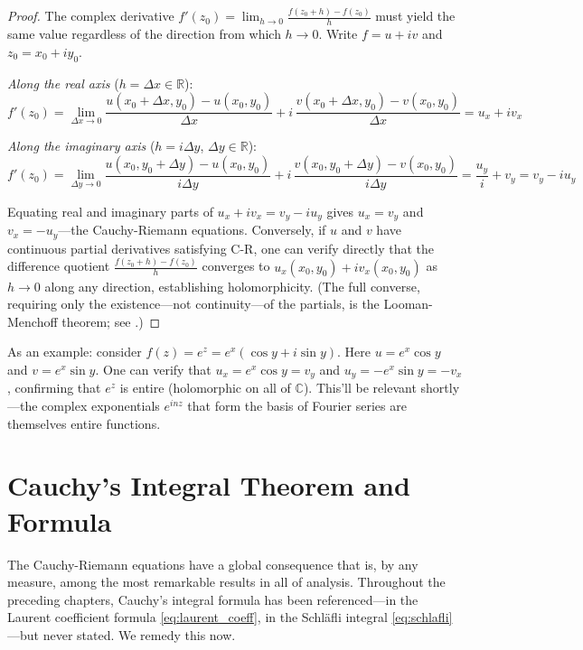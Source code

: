 \documentclass[12pt,a4paper]{report}
\theoremstyle{thms}
\theoremstyle{defns}
\begin{document}
\begin{proof}
    The complex derivative $f'(z_0) = \lim_{h\to 0} \frac{f(z_0+h) - f(z_0)}{h}$ must yield the same value regardless of the direction from which $h \to 0$. Write $f = u + iv$ and $z_0 = x_0 + iy_0$.

    \textit{Along the real axis} ($h = \Delta x \in \mathbb{R}$):
    \begin{equation}
        f'(z_0) = \lim_{\Delta x \to 0} \dfrac{u(x_0 + \Delta x, y_0) - u(x_0, y_0)}{\Delta x} + i\,\dfrac{v(x_0 + \Delta x, y_0) - v(x_0, y_0)}{\Delta x} = u_x + iv_x
    \end{equation}

    \textit{Along the imaginary axis} ($h = i\Delta y$, $\Delta y \in \mathbb{R}$):
    \begin{equation}
        f'(z_0) = \lim_{\Delta y \to 0} \dfrac{u(x_0, y_0 + \Delta y) - u(x_0, y_0)}{i\Delta y} + i\,\dfrac{v(x_0, y_0 + \Delta y) - v(x_0, y_0)}{i\Delta y} = \dfrac{u_y}{i} + v_y = v_y - iu_y
    \end{equation}

    Equating real and imaginary parts of $u_x + iv_x = v_y - iu_y$ gives $u_x = v_y$ and $v_x = -u_y$—the Cauchy-Riemann equations. Conversely, if $u$ and $v$ have continuous partial derivatives satisfying C-R, one can verify directly that the difference quotient $\frac{f(z_0 + h) - f(z_0)}{h}$ converges to $u_x(x_0, y_0) + iv_x(x_0, y_0)$ as $h \to 0$ along any direction, establishing holomorphicity. (The full converse, requiring only the existence—not continuity—of the partials, is the Looman-Menchoff theorem; see \cite{ahlfors_complex}.)
\end{proof}

As an example: consider $f(z) = e^z = e^x(\cos y + i\sin y)$. Here $u = e^x\cos y$ and $v = e^x\sin y$. One can verify that $u_x = e^x\cos y = v_y$ and $u_y = -e^x\sin y = -v_x$, confirming that $e^z$ is entire (holomorphic on all of $\mathbb{C}$). This'll be relevant shortly—the complex exponentials $e^{inz}$ that form the basis of Fourier series are themselves entire functions.

\section{Cauchy's Integral Theorem and Formula}
\label{sec:cauchy_integral}

The Cauchy-Riemann equations have a global consequence that is, by any measure, among the most remarkable results in all of analysis. Throughout the preceding chapters, Cauchy's integral formula has been referenced—in the Laurent coefficient formula \eqref{eq:laurent_coeff}, in the Schl\"{a}fli integral \eqref{eq:schlafli}—but never stated. We remedy this now.
\end{document}

